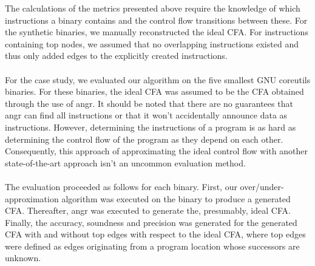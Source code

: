 \documentclass{kththesis}
\begin{document}
The calculations of the metrics presented above require the knowledge of which instructions a binary contains and the control flow transitions between these. For the synthetic binaries, we manually reconstructed the ideal CFA. For instructions containing top nodes, we assumed that no overlapping instructions existed and thus only added edges to the explicitly created instructions.
\\ \\
For the case study, we evaluated our algorithm on the five smallest GNU coreutils binaries. For these binaries, the ideal CFA was assumed to be the CFA obtained through the use of angr\cite{angr}. It should be noted that there are no guarantees that angr can find all instructions or that it won't accidentally announce data as instructions. However, determining the instructions of a program is as hard as determining the control flow of the program as they depend on each other. Consequently, this approach of approximating the ideal control flow with another state-of-the-art approach isn't an uncommon evaluation method\cite{preciseCFG}\cite{alternating}.
\\ \\
The evaluation proceeded as follows for each binary. First, our over/under-approximation algorithm was executed on the binary to produce a generated CFA. Thereafter, angr was executed to generate the, presumably, ideal CFA. Finally, the accuracy, soundness and precision was generated for the generated CFA with and without top edges with respect to the ideal CFA, where top edges were defined as edges originating from a program location whose successors are unknown.

\end{document}
